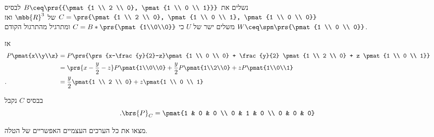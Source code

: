 \documentclass[a4paper,10pt,oneside,openany]{article}
\begin{document}
\begin{solution}
נשלים את
$B \ceq \prs{{\pmat{1 \\ 2 \\ 0}, \pmat{1 \\ 0 \\ 1}}}$
לבסיס
$C = \prs{\pmat{1 \\ 2 \\ 0}, \pmat{1 \\ 0 \\ 1}, \pmat{1 \\ 0 \\ 0}}$
של
$\mbb{R}^3$
ואז
$W \ceq \spn\prs{\pmat{1 \\ 0 \\ 0}}$
משלים ישר של
$U$
כי
$C = B * \prs{\pmat{1\\0\\0}}$
ומתרגיל מהתרגול הקודם.

אז
\begin{align*}
P\pmat{x\\y\\z} &= P\prs{\prs{x-\frac{y}{2}-z}\pmat{1 \\ 0 \\ 0} + \frac{y}{2} \pmat{1 \\ 2 \\ 0} + z \pmat{1 \\ 0 \\ 1}}
\\&=
\prs{x-\frac{y}{2} - z} P\pmat{1\\0\\0} + \frac{y}{2} P\pmat{1\\2\\0} + z P\pmat{1\\0\\1}
\\ \text{.} \hphantom{P\pmat{x\\y\\z}} &= \frac{y}{2} \pmat{1 \\ 2 \\ 0} + z \pmat{1 \\ 0 \\ 1}
\end{align*}

בבסיס
$C$
נקבל
\[\text{.} \brs{P}_C = \pmat{1 & 0 & 0 \\ 0 & 1 & 0 \\ 0 & 0 & 0}\]
\end{solution}

\begin{exercise}
מצאו את כל הערכים העצמיים האפשריים של הטלה.
\end{exercise}
\end{document}
